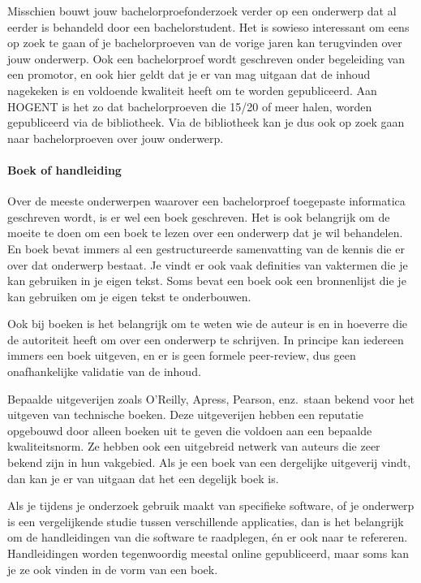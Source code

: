 Misschien bouwt jouw bachelorproefonderzoek verder op een onderwerp dat al eerder is behandeld door een bachelorstudent. Het is sowieso interessant om eens op zoek te gaan of je bachelorproeven van de vorige jaren kan terugvinden over jouw onderwerp. Ook een bachelorproef wordt geschreven onder begeleiding van een promotor, en ook hier geldt dat je er van mag uitgaan dat de inhoud nagekeken is en voldoende kwaliteit heeft om te worden gepubliceerd. Aan HOGENT is het zo dat bachelorproeven die 15/20 of meer halen, worden gepubliceerd via de bibliotheek. Via de bibliotheek kan je dus ook op zoek gaan naar bachelorproeven over jouw onderwerp.

\paragraph{Boek of handleiding}

Over de meeste onderwerpen waarover een bachelorproef toegepaste informatica geschreven wordt, is er wel een boek geschreven. Het is ook belangrijk om de moeite te doen om een boek te lezen over een onderwerp dat je wil behandelen. En boek bevat immers al een gestructureerde samenvatting van de kennis die er over dat onderwerp bestaat. Je vindt er ook vaak definities van vaktermen die je kan gebruiken in je eigen tekst. Soms bevat een boek ook een bronnenlijst die je kan gebruiken om je eigen tekst te onderbouwen.

Ook bij boeken is het belangrijk om te weten wie de auteur is en in hoeverre die de autoriteit heeft om over een onderwerp te schrijven. In principe kan iedereen immers een boek uitgeven, en er is geen formele peer-review, dus geen onafhankelijke validatie van de inhoud.

Bepaalde uitgeverijen zoals O'Reilly, Apress, Pearson, enz.\ staan bekend voor het uitgeven van technische boeken. Deze uitgeverijen hebben een reputatie opgebouwd door alleen boeken uit te geven die voldoen aan een bepaalde kwaliteitsnorm. Ze hebben ook een uitgebreid netwerk van auteurs die zeer bekend zijn in hun vakgebied. Als je een boek van een dergelijke uitgeverij vindt, dan kan je er van uitgaan dat het een degelijk boek is.

Als je tijdens je onderzoek gebruik maakt van specifieke software, of je onderwerp is een vergelijkende studie tussen verschillende applicaties, dan is het belangrijk om de handleidingen van die software te raadplegen, én er ook naar te refereren. Handleidingen worden tegenwoordig meestal online gepubliceerd, maar soms kan je ze ook vinden in de vorm van een boek.

